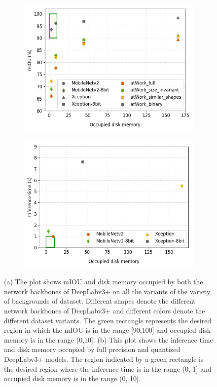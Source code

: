 	\begin{figure}
		\centering
		\begin{subfigure}{.45\textwidth}
			\centering
			\includegraphics[width=1\linewidth]{images/quant}
			\caption{}
			\label{Fig:quantb}
		\end{subfigure}
		\begin{subfigure}{.45\textwidth}
			\centering
			\includegraphics[width=1\linewidth]{images/quant_time}
			\caption{}
			\label{Fig:quanta}
		\end{subfigure}
		\caption{(a) The plot shows mIOU and disk memory occupied by both the network backbones of DeepLabv3+ on all the variants of the variety of backgrounds of dataset. Different shapes denote the different network backbones of DeepLabv3+ and different colors denote the different dataset variants. The green rectangle represents the desired region in which the mIOU is in the range [90,100] and occupied disk memory is in the range (0,10]. (b) This plot shows the inference time and disk memory occupied by full precision and quantized DeepLabv3+ models. The region indicated by a green rectangle is the desired region where the inference time is in the range (0, 1] and occupied disk memory is in the range (0, 10].}
		\label{Fig:quant}
	\end{figure}
	
